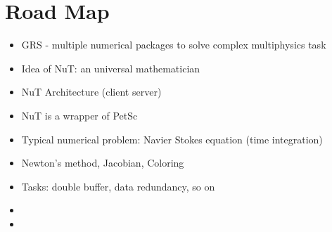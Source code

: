 \chapter{Road Map}\label{chapter:road map}

\begin{itemize}
\item GRS - multiple numerical packages to solve complex multiphysics task
\item Idea of NuT: an universal mathematician 
\item NuT Architecture (client server)
\item NuT is a wrapper of PetSc
\item Typical numerical problem: Navier Stokes equation (time integration)
\item Newton's method, Jacobian, Coloring
\item Tasks: double buffer, data redundancy, so on
\item 
\item 
\end{itemize}